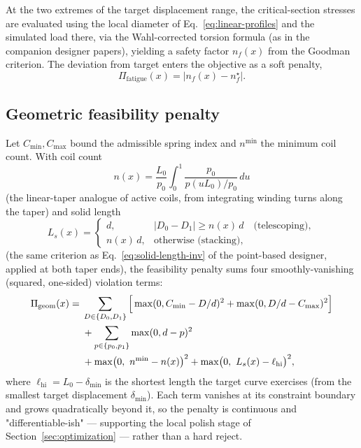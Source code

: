 \documentclass[11pt]{article}
\begin{document}
At the two extremes of the target displacement range, the critical-section
stresses are evaluated using the local diameter of
Eq.~\eqref{eq:linear-profiles} and the simulated load there, via the
Wahl-corrected torsion formula (as in the companion designer papers),
yielding a safety factor $n_f(x)$ from the Goodman criterion. The
deviation from target enters the objective as a soft penalty,
\begin{equation}
\Pi_{\mathrm{fatigue}}(x) = \big|n_f(x) - n_f^{\star}\big| .
\label{eq:fatigue-penalty}
\end{equation}

\subsection{Geometric feasibility penalty}

Let $C_{\min},C_{\max}$ bound the admissible spring index and $n^{\min}$
the minimum coil count. With coil count
\begin{equation}
n(x) = \frac{L_0}{p_0}\int_0^1 \frac{p_0}{p(u L_0)/p_0}\,du
\end{equation}
(the linear-taper analogue of active coils, from integrating winding
turns along the taper) and solid length
\begin{equation}
L_s(x) =
\begin{cases}
d, & |D_0-D_1| \ge n(x)\,d \quad \text{(telescoping)}, \\
n(x)\,d, & \text{otherwise (stacking)},
\end{cases}
\label{eq:solid-length-curve}
\end{equation}
(the same criterion as Eq.~\eqref{eq:solid-length-inv} of the point-based
designer, applied at both taper ends), the feasibility penalty sums four
smoothly-vanishing (squared, one-sided) violation terms:
\begin{align}
\Pi_{\mathrm{geom}}(x) = {}& \sum_{D\in\{D_0,D_1\}}\Big[\max(0, C_{\min}-D/d)^2 + \max(0, D/d-C_{\max})^2\Big] \notag\\
&+ \sum_{p\in\{p_0,p_1\}} \max(0, d-p)^2 \notag \\
&+ \max\!\big(0,\ n^{\min}-n(x)\big)^2
+ \max\!\big(0,\ L_s(x) - \ell_{\mathrm{hi}}\big)^2 ,
\label{eq:geometry-penalty}
\end{align}
where $\ell_{\mathrm{hi}} = L_0 - \delta_{\min}$ is the shortest length
the target curve exercises (from the smallest target displacement
$\delta_{\min}$). Each term vanishes at its constraint boundary and grows
quadratically beyond it, so the penalty is continuous and
"differentiable-ish" — supporting the local polish stage of
Section~\ref{sec:optimization} — rather than a hard reject.
\end{document}
